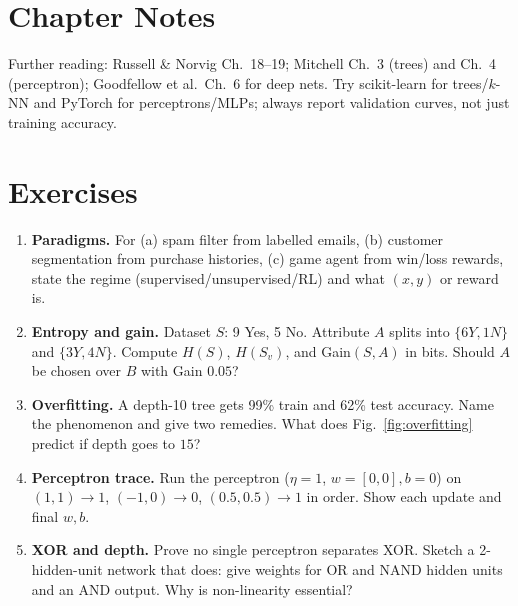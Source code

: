 \section{Chapter Notes}
Further reading: Russell \& Norvig Ch.~18--19; Mitchell Ch.~3 (trees) and Ch.~4 (perceptron); Goodfellow et al.\ Ch.~6 for deep nets. Try scikit-learn for trees/$k$-NN and PyTorch for perceptrons/MLPs; always report validation curves, not just training accuracy.

\section{Exercises}
\label{sec:ch08-ex}
\begin{enumerate}[label=E8.\arabic*, leftmargin=*, itemsep=0.7em]
    \item \textbf{Paradigms.} For (a) spam filter from labelled emails, (b) customer segmentation from purchase histories, (c) game agent from win/loss rewards, state the regime (supervised/unsupervised/RL) and what $(x,y)$ or reward is.
    \item \textbf{Entropy and gain.} Dataset $S$: 9 Yes, 5 No. Attribute $A$ splits into $\{6Y,1N\}$ and $\{3Y,4N\}$. Compute $H(S)$, $H(S_v)$, and Gain$(S,A)$ in bits. Should $A$ be chosen over $B$ with Gain $0.05$?
    \item \textbf{Overfitting.} A depth-10 tree gets 99\% train and 62\% test accuracy. Name the phenomenon and give two remedies. What does Fig.~\ref{fig:overfitting} predict if depth goes to $15$?
    \item \textbf{Perceptron trace.} Run the perceptron ($\eta=1$, $w=[0,0],b=0$) on $(1,1)\!\to\!1$, $(-1,0)\!\to\!0$, $(0.5,0.5)\!\to\!1$ in order. Show each update and final $w,b$.
    \item \textbf{XOR and depth.} Prove no single perceptron separates XOR. Sketch a 2-hidden-unit network that does: give weights for OR and NAND hidden units and an AND output. Why is non-linearity essential?
\end{enumerate}
